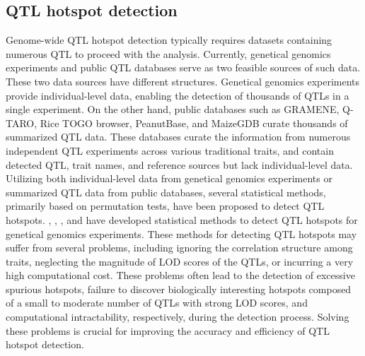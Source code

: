 \subsection{QTL hotspot detection}

Genome-wide QTL hotspot detection typically requires datasets containing numerous QTL to proceed with the analysis. Currently, genetical genomics experiments and public QTL databases serve as two feasible sources of such data. These two data sources have different structures. Genetical genomics experiments provide individual-level data, enabling the detection of thousands of QTLs in a single experiment. On the other hand, public databases such as GRAMENE, Q-TARO, Rice TOGO browser, PeanutBase, and MaizeGDB curate thousands of summarized QTL data. These databases curate the information from numerous independent QTL experiments across various traditional traits, and contain detected QTL, trait names, and reference sources but lack individual-level data. Utilizing both individual-level data from genetical genomics experiments or summarized QTL data from public databases, several statistical methods, primarily based on permutation tests, have been proposed to detect QTL hotspots. \citet{West-2007}, \citet{Wu-2008}, \citet{Li-2010}, \citet{Breitling-2008} and \citet{Neto-2012} have developed statistical methods to detect QTL hotspots for genetical genomics experiments. These methods for detecting QTL hotspots may suffer from several problems, including ignoring the correlation structure among traits, neglecting the magnitude of LOD scores of the QTLs, or incurring a very high computational cost. These problems often lead to the detection of excessive spurious hotspots, failure to discover biologically interesting hotspots composed of a small to moderate number of QTLs with strong LOD scores, and computational intractability, respectively, during the detection process. Solving these problems is crucial for improving the accuracy and efficiency of QTL hotspot detection.

